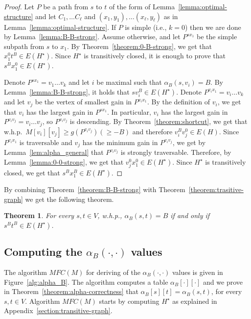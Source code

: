 \documentclass[11pt]{article}
\newtheorem{theorem}{Theorem}[section]
\begin{document}
\begin{proof}
    Let $P$ be a path from $s$ to $t$ of the form of Lemma~\ref{lemma:optimal-structure} and let $C_1, \ldots C_{\ell}$ and $(x_1,y_1),\ldots(x_{\ell},y_{\ell})$ as in Lemma~\ref{lemma:optimal-structure}.
    If $P$ is simple (i.e., $k=0$) then we are done by Lemma~\ref{lemma:B-B-strong}. Assume otherwise, and let $P^{s x_1}$ be the simple subpath from $s$ to $x_1$. 
    By Theorem~\ref{theorem:0-B-strong}, we get that $x_1^0 t^B \in E(H^\star)$. Since $H^\star$ is transitively closed, it is enough to prove that $s^B x_1^0 \in E(H^\star)$. 

    Denote $P^{s x_1} = v_1\ldots v_k$ and let $i$ be maximal such that $\alpha_B(s,v_i)= B$. By Lemma~\ref{lemma:B-B-strong}, it holds that $s v_i^B \in E(H^\star)$. Denote $P^{v_i x_1} = v_i\ldots v_k$ and let  $v_j$ be the vertex of smallest gain in $P^{v_i x_1}$. By the definition of $v_i$, we get that $v_i$ has the largest gain in $P^{s x_1}$. In particular, $v_i$ has the largest gain in $P^{v_i v_j} = v_i \ldots v_j$, so $P^{v_i v_j}$ is descending. By Theorem~\ref{theorem:shortcut}, we get that w.h.p.\ $M[v_i][v_j]\ge g(P^{v_i v_j})(\ge -B)$ and therefore $v_i^B v_j^0 \in E(H)$. Since $P^{v_i x_1}$ is traversable and $v_j$ has the minimum gain in $P^{v_i v_j}$, we get by Lemma~\ref{lem:alpha_general} that $P^{v_i v_j}$ is strongly traversable. Therefore, by Lemma~\ref{lemma:0-0-strong}, we get that $v_j^0 x_1^0 \in E(H^\star)$. Since $H^\star$ is transitively closed, we get that $s^B x_1^B \in E(H^\star)$.
\end{proof}

By combining Theorem~\ref{theorem:B-B-strong} with Theorem~\ref{theorem:trasitive-graph} we get the following theorem.

\begin{theorem}\label{theorem:B-B-strong-full}
    For every $s,t\in V$, w.h.p., $\alpha_B(s,t)=B$ if and only if $s^B t^B \in E(H^\star)$.
\end{theorem}



\subsection{Computing the \texorpdfstring{$\alpha_B(\cdot, \cdot)$}{alphaB function} values}\label{section:compute-alpha}

The algorithm $MFC(M)$ for deriving of the $\alpha_B(\cdot,\cdot)$ values is given in Figure~\ref{alg:alpha_B}.
The algorithm computes a table $\alpha_B[\cdot][\cdot]$ and we prove in Theorem~\ref{theorem:alpha-correctness} that  $\alpha_B[s][t] = \alpha_B(s,t)$, for every $s,t\in V$. Algorithm $MFC(M)$ starts by computing $H^\star$ as explained in Appendix~\ref{section:transitive-graph}.
\end{document}
